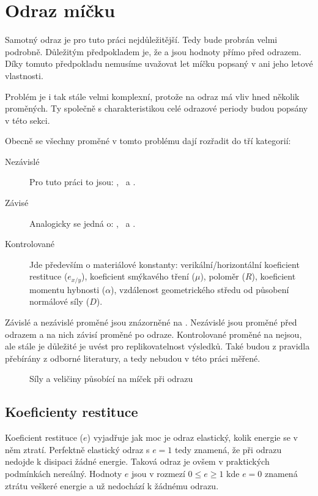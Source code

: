 \section{Odraz míčku}
\label{sec:odraz-micku}

Samotný odraz je pro tuto práci nejdůležitější. Tedy bude probrán velmi
podrobně. Důležitým předpokladem je, že  a  jsou hodnoty přímo
před odrazem. Díky tomuto předpokladu nemusíme uvažovat let míčku
popsaný v  ani jeho letové vlastnosti.

Problém je i tak stále velmi komplexní, protože na odraz má vliv hned několik
proměných. Ty společně s charakteristikou celé odrazové periody budou popsány v
této sekci.

Obecně se všechny proměné v tomto problému dají rozřadit do tří kategorií:

\begin{description}
 \item[Nezávislé] Pro tuto práci to jsou: ,~ a .
 \item[Závisé] Analogicky se jedná o: ,~ a .
 \item[Kontrolované] Jde především o materiálové konstanty:
  verikální/horizontální koeficient restituce ($e_{x/y}$), koeficient smýkavého
 tření ($\mu$), poloměr ($R$), koeficient momentu hybnosti ($\alpha$),
 vzdálenost geometrického středu od působení normálové síly ($D$).
\end{description}

Závislé a nezávislé proměné jsou znázorněné na .
Nezávislé jsou proměné před odrazem a na nich závisí proměné po odraze.
Kontrolované proměné na  nejsou, ale stále je
důležité je uvést pro replikovatelnost výsledků. Také budou z pravidla přebírány
z odborné literatury, a tedy nebudou v této práci měřené.

\begin{figure}[htbp]
 \centering
 

 \caption{Síly a veličiny působící na míček při odrazu}
 \label{fig:odraz-micku}
\end{figure}

\subsection{Koeficienty restituce}
\label{ssec:koeficienty-restituce}
Koeficient restituce ($e$) vyjadřuje jak moc je odraz elastický, kolik energie
se v něm ztratí. Perfektně elastický odraz s $e=1$ tedy znamená, že při odrazu
nedojde k disipaci žádné energie. Taková odraz je ovšem v praktických podmínkách
nereálný. Hodnoty $e$ jsou v rozmezí $0 \leq e \geq 1$ kde $e=0$ znamená ztrátu
veškeré energie a už nedochází k žádnému odrazu.
\autocite{ahmadImpactModelsCoefficient2016,CoefficientRestitutionFormula}

